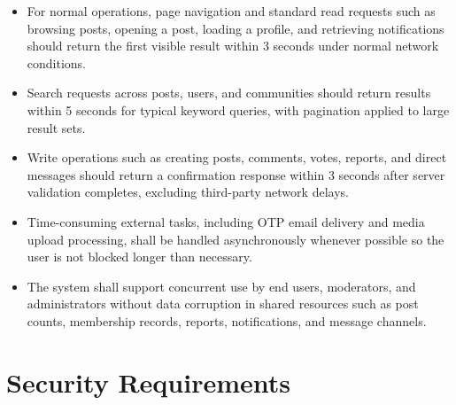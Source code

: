 \documentclass{scrreprt}
\begin{document}
\begin{itemize}[leftmargin=2cm]
    \item[\textbf{PR-1:}] For normal operations, page navigation and standard read requests such as browsing posts, opening a post, loading a profile, and retrieving notifications should return the first visible result within 3 seconds under normal network conditions.
    \item[\textbf{PR-2:}] Search requests across posts, users, and communities should return results within 5 seconds for typical keyword queries, with pagination applied to large result sets.
    \item[\textbf{PR-3:}] Write operations such as creating posts, comments, votes, reports, and direct messages should return a confirmation response within 3 seconds after server validation completes, excluding third-party network delays.
    \item[\textbf{PR-4:}] Time-consuming external tasks, including OTP email delivery and media upload processing, shall be handled asynchronously whenever possible so the user is not blocked longer than necessary.
    \item[\textbf{PR-5:}] The system shall support concurrent use by end users, moderators, and administrators without data corruption in shared resources such as post counts, membership records, reports, notifications, and message channels.
\end{itemize}

\section{Security Requirements}
\end{document}
